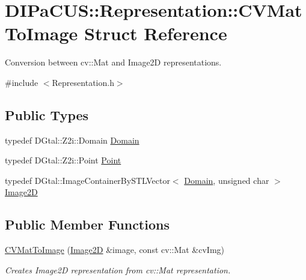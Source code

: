 \hypertarget{structDIPaCUS_1_1Representation_1_1CVMatToImage}{}\section{D\+I\+Pa\+C\+US\+:\+:Representation\+:\+:C\+V\+Mat\+To\+Image Struct Reference}
\label{structDIPaCUS_1_1Representation_1_1CVMatToImage}


Conversion between cv\+::\+Mat and Image2D representations.  




{\ttfamily \#include $<$Representation.\+h$>$}

\subsection*{Public Types}
\begin{DoxyCompactItemize}
\item 
typedef D\+Gtal\+::\+Z2i\+::\+Domain \mbox{\hyperlink{structDIPaCUS_1_1Representation_1_1CVMatToImage_a5d9aec8c9bd96fa66e4f7ed3a8feac02}{Domain}}
\item 
typedef D\+Gtal\+::\+Z2i\+::\+Point \mbox{\hyperlink{structDIPaCUS_1_1Representation_1_1CVMatToImage_ac277d341558772f06247220cbdca4118}{Point}}
\item 
typedef D\+Gtal\+::\+Image\+Container\+By\+S\+T\+L\+Vector$<$ \mbox{\hyperlink{structDIPaCUS_1_1Representation_1_1CVMatToImage_a5d9aec8c9bd96fa66e4f7ed3a8feac02}{Domain}}, unsigned char $>$ \mbox{\hyperlink{structDIPaCUS_1_1Representation_1_1CVMatToImage_a3e6b8dea7273472226dfb9d161e7ee26}{Image2D}}
\end{DoxyCompactItemize}
\subsection*{Public Member Functions}
\begin{DoxyCompactItemize}
\item 
\mbox{\hyperlink{structDIPaCUS_1_1Representation_1_1CVMatToImage_a84778cfc56aa2ea2e2aef0c30a8fd0f4}{C\+V\+Mat\+To\+Image}} (\mbox{\hyperlink{structDIPaCUS_1_1Representation_1_1CVMatToImage_a3e6b8dea7273472226dfb9d161e7ee26}{Image2D}} \&image, const cv\+::\+Mat \&cv\+Img)
\begin{DoxyCompactList}\small\item\em Creates Image2D representation from cv\+::\+Mat representation. \end{DoxyCompactList}\end{DoxyCompactItemize}


